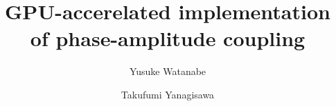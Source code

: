 \documentclass[preprint,review,12pt]{elsarticle}%
\begin{document}
\begin{frontmatter}





\title{
    GPU-accerelated implementation of phase-amplitude coupling
}
\author[1,2]{Yusuke Watanabe}
\author[1,5]{Takufumi Yanagisawa}

\address[1]{Institute for Advanced Cocreation studies, Osaka University, 2-2 Yamadaoka, Suita, 565-0871, Osaka, Japan}
\address[2]{NeuroEngineering Research Laboratory, Department of Biomedical Engineering, The University of Melbourne, Parkville VIC 3010, Australia}
\address[5]{Department of Neurosurgery, Osaka University Graduate School of Medicine, 2-2 Yamadaoka, Osaka, 565-0871, Japan}



\end{frontmatter}
\end{document}
